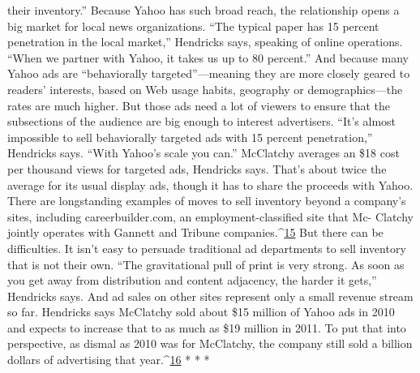 their inventory.''
Because Yahoo has such broad reach, the relationship opens a big market for local
news organizations. ``The typical paper has 15 percent penetration in the local
market,'' Hendricks says, speaking of online operations. ``When we partner with
Yahoo, it takes us up to 80 percent.'' And because many Yahoo ads are ``behaviorally
targeted''—meaning they are more closely geared to readers' interests, based
on Web usage habits, geography or demographics—the rates are much higher.
But those ads need a lot of viewers to ensure that the subsections of the audience
are big enough to interest advertisers. ``It's almost impossible to sell behaviorally
targeted ads with 15 percent penetration,'' Hendricks says. ``With Yahoo's scale
you can.'' McClatchy averages an \$18 cost per thousand views for targeted ads,
Hendricks says. That's about twice the average for its usual display ads, though it
has to share the proceeds with Yahoo.
There are longstanding examples of moves to sell inventory beyond a company's
sites, including careerbuilder.com, an employment-classified site that Mc-
Clatchy jointly operates with Gannett and Tribune companies.^{\href{#endnotes-chapter-8}{15}} But there can
be difficulties. It isn't easy to persuade traditional ad departments to sell inventory
that is not their own. ``The gravitational pull of print is very strong. As soon as
you get away from distribution and content adjacency, the harder it gets,'' Hendricks
says. And ad sales on other sites represent only a small revenue stream
so far. Hendricks says McClatchy sold about \$15 million of Yahoo ads in 2010
and expects to increase that to as much as \$19 million in 2011. To put that into
perspective, as dismal as 2010 was for McClatchy, the company still sold a billion
dollars of advertising that year.^{\href{#endnotes-chapter-8}{16}}
* * *

